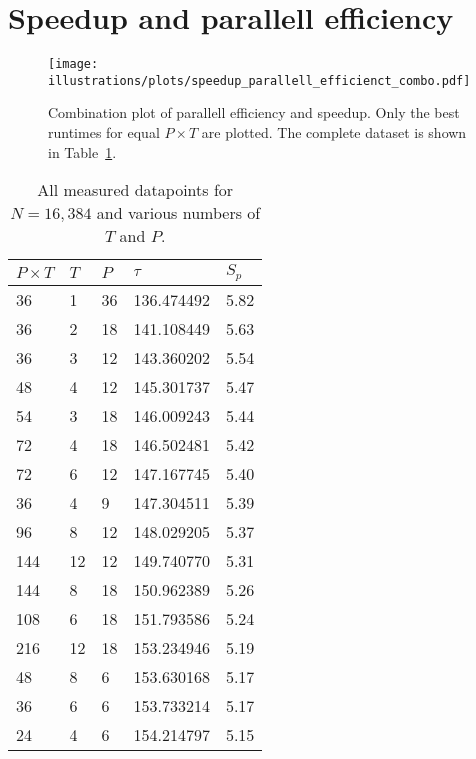 
\section{Speedup and parallell efficiency} %
\label{sec:speedup_and_parallell_efficiency}


\begin{figure}[htbp]
  \centering
  \texttt{[image: illustrations/plots/speedup\_parallell\_efficienct\_combo.pdf]}
  \caption{Combination plot of parallell efficiency and speedup. Only the best runtimes for equal $P\times T$ are plotted. The complete dataset is shown in Table~\ref{tab:speedup_all_data}.}
  \label{fig:plot_pe_sp}
\end{figure}

\begin{table}[H]
  \centering
  \caption{All measured datapoints for $N=16,384$ and various numbers of $T$ and $P$.}
  \label{tab:speedup_all_data}
  \begin{tabularx}{0.8\textwidth}{XXXX|X}
    \toprule
    $P\times T$ & $T$ & $P$ & $\tau$ & $S_p$ \\
    \midrule
    36   &  1   & 36    &  136.474492 & 5.82 \\
    36   &  2   & 18    &  141.108449 & 5.63 \\
    36   &  3   & 12    &  143.360202 & 5.54 \\
    48   &  4   & 12    &  145.301737 & 5.47 \\
    54   &  3   & 18    &  146.009243 & 5.44 \\
    72   &  4   & 18    &  146.502481 & 5.42 \\
    72   &  6   & 12    &  147.167745 & 5.40 \\
    36   &  4   & 9     &  147.304511 & 5.39 \\
    96   &  8   & 12    &  148.029205 & 5.37 \\
    144  &  12  & 12    &  149.740770 & 5.31 \\
    144  &  8   & 18    &  150.962389 & 5.26 \\
    108  &  6   & 18    &  151.793586 & 5.24 \\
    216  &  12  & 18    &  153.234946 & 5.19 \\
    48   &  8   & 6     &  153.630168 & 5.17 \\
    36   &  6   & 6     &  153.733214 & 5.17 \\
    24   &  4   & 6     &  154.214797 & 5.15 \\

\end{tabularx}
\end{table}
